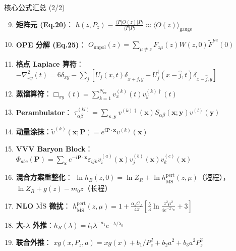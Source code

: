 \documentclass[10pt,aspectratio=169]{beamer}
\newcommand{\msbar}{\overline{\mathrm{MS}}}
\newcommand{\alphas}{\alpha_s}
\newcommand{\Pz}{P_z}
\newcommand{\CA}{C_A}
\begin{document}
\begin{frame}{核心公式汇总 (2/2)}
\small
\begin{enumerate}
  \setcounter{enumi}{8}
  \item \textbf{矩阵元 (Eq.20)}：
  $h(z,\Pz) \equiv \frac{\langle P|O(z)|P\rangle}{\langle P|P\rangle} \approx \langle O(z)\rangle_{\text{gauge}}$

  \item \textbf{OPE 分解 (Eq.25)}：
  $O_{\text{unpol}}(z) = \sum_{\mu\neq z} F_{z\mu}(z)W(z,0)\tilde{F}^{\mu z}(0)$

  \item \textbf{格点 Laplace 算符}：
  $-\nabla^2_{xy}(t) = 6\delta_{xy} - \sum_j[U_j(x,t)\delta_{x+\hat{j},y} + U_j^\dagger(x-\hat{j},t)\delta_{x-\hat{j},y}]$

  \item \textbf{蒸馏算符}：$\Box_{xy}(t) = \sum_{k=1}^{N_{\text{ev}}} v^{(k)}_x(t)v^{(k)\dagger}_y(t)$

  \item \textbf{Perambulator}：
  $\tau^{(kl)}_{\alpha\beta} = \sum_{\mathbf{x},\mathbf{y}} v^{(k)\dagger}(\mathbf{x})S_{\alpha\beta}(\mathbf{x};\mathbf{y})v^{(l)}(\mathbf{y})$

  \item \textbf{动量涂抹}：$\tilde{v}^{(k)}(\mathbf{x};\mathbf{P}) = e^{i\mathbf{P}\cdot\mathbf{x}}v^{(k)}(\mathbf{x})$

  \item \textbf{VVV Baryon Block}：
  $\Phi_{abc}(\mathbf{P}) = \sum_{\mathbf{x}} e^{-i\mathbf{P}\cdot\mathbf{x}}\varepsilon_{ijk}v_i^{(a)}(\mathbf{x})v_j^{(b)}(\mathbf{x})v_k^{(c)}(\mathbf{x})$

  \item \textbf{混合方案重整化}：
  $\ln h_B(z,0) = \ln Z_R + \ln h_{\msbar}^{\text{pert}}(z,\mu)$（短程），
  $\ln Z_R + g(z) - m_0 z$（长程）

  \item \textbf{NLO $\msbar$ 微扰}：
  $h_{\msbar}^{\text{pert}}(z,\mu) = 1 + \frac{\alphas\CA}{4\pi}[\frac{5}{3}\ln\frac{z^2\mu^2}{4e^{-2\gamma_E}} + 3]$

  \item \textbf{大-$\lambda$ 外推}：$h_R(\lambda) = l_1\lambda^{-a_1}e^{-\lambda/\lambda_0}$

  \item \textbf{联合外推}：
  $x g(x,\Pz,a) = x g(x) + b_1/\Pz^2 + b_2 a^2 + b_3 a^2\Pz^2$
\end{enumerate}
\end{frame}
\end{document}
